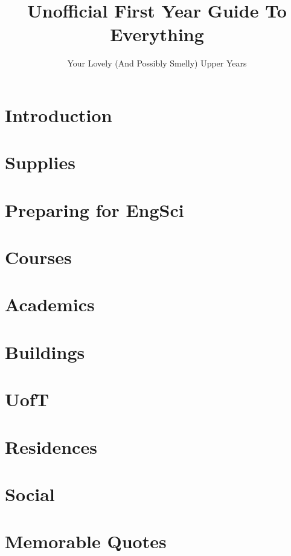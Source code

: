 \documentclass[12pt]{report}
\author{Your Lovely (And Possibly Smelly) Upper Years}
\title{Unofficial First Year Guide To Everything}
\begin{document}
\maketitle
\tableofcontents

\chapter{Introduction}

\chapter{Supplies}


\chapter{Preparing for EngSci}


\chapter{Courses}


\chapter{Academics}


\chapter{Buildings}


\chapter{UofT}


\chapter{Residences}


\chapter{Social}


\chapter{Memorable Quotes}

\end{document}
